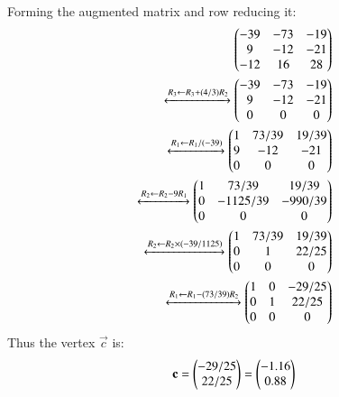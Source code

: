 \begin{enumerate}
\begin{align}
\end{align}
Forming the augmented matrix and row reducing it:
\begin{align}
\begin{pmatrix}-39 & -73 & -19\\9 & -12 & -21 \\-12 & 16 &28 \end{pmatrix}\\
\xleftrightarrow[]{R_3\leftarrow R_3+(4/3)R_2} 
\begin{pmatrix}-39 & -73 & -19\\9 & -12 & -21 \\0 & 0 &0 \end{pmatrix}\\
\xleftrightarrow[]{R_1\leftarrow R_1/(-39)} 
\begin{pmatrix}1 & 73/39 & 19/39\\9 & -12 & -21 \\0 & 0 &0 \end{pmatrix}\\
\xleftrightarrow[]{R_2\leftarrow R_2-9R_1}
\begin{pmatrix}1 & 73/39 & 19/39\\0 & -1125/39 & -990/39 \\0 & 0 &0\end{pmatrix}\\ 
\xleftrightarrow[]{R_2\leftarrow R_2 \times (-39/1125)}
\begin{pmatrix}1 & 73/39 & 19/39\\0 & 1 & 22/25 \\0 & 0 &0\end{pmatrix}\\
\xleftrightarrow[]{R_1\leftarrow R_1 -(73/39)R_2}
\begin{pmatrix}1 & 0 & -29/25\\0 & 1 & 22/25 \\0 & 0 &0\end{pmatrix}
\end{align}
Thus the vertex $\vec{c}$ is:
\begin{align}
\mathbf{c}=\begin{pmatrix} -29/25\\22/25\end{pmatrix}= \begin{pmatrix}-1.16\\ 0.88\end{pmatrix} 
\end{align}


\end{enumerate}
